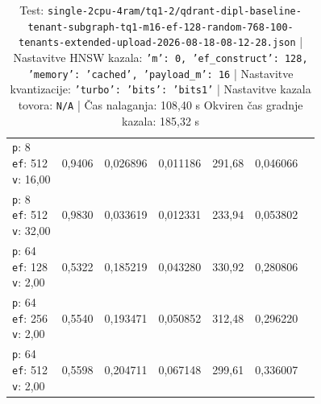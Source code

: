 \begin{table}[htbp]
\begin{tabularx}{\textwidth}{Xrrrrrr}
    \makecell{\texttt{p}: 8\\\texttt{ef}: 512\\\texttt{v}: 16,00} & 0,9406 & 0,026896 & 0,011186 & 291,68 & 0,046066 \\
    \makecell{\texttt{p}: 8\\\texttt{ef}: 512\\\texttt{v}: 32,00} & 0,9830 & 0,033619 & 0,012331 & 233,94 & 0,053802 \\
    \makecell{\texttt{p}: 64\\\texttt{ef}: 128\\\texttt{v}: 2,00} & 0,5322 & 0,185219 & 0,043280 & 330,92 & 0,280806 \\
    \makecell{\texttt{p}: 64\\\texttt{ef}: 256\\\texttt{v}: 2,00} & 0,5540 & 0,193471 & 0,050852 & 312,48 & 0,296220 \\
    \makecell{\texttt{p}: 64\\\texttt{ef}: 512\\\texttt{v}: 2,00} & 0,5598 & 0,204711 & 0,067148 & 299,61 & 0,336007 \\
    \bottomrule
  \end{tabularx}
\caption* {Test: \texttt{single-2cpu-4ram/tq1-2/qdrant-dipl-baseline-tenant-subgraph-tq1-m16-ef-128-random-768-100-tenants-extended-upload-2026-08-18-08-12-28.json} | Nastavitve HNSW kazala: \texttt{{'m': 0, 'ef\_construct': 128, 'memory': 'cached', 'payload\_m': 16}} | Nastavitve kvantizacije: \texttt{{'turbo': {'bits': 'bits1'}}} | Nastavitve kazala tovora: \texttt{N/A} | Čas nalaganja: 108,40 s Okviren čas gradnje kazala: 185,32 s}\end{table}



